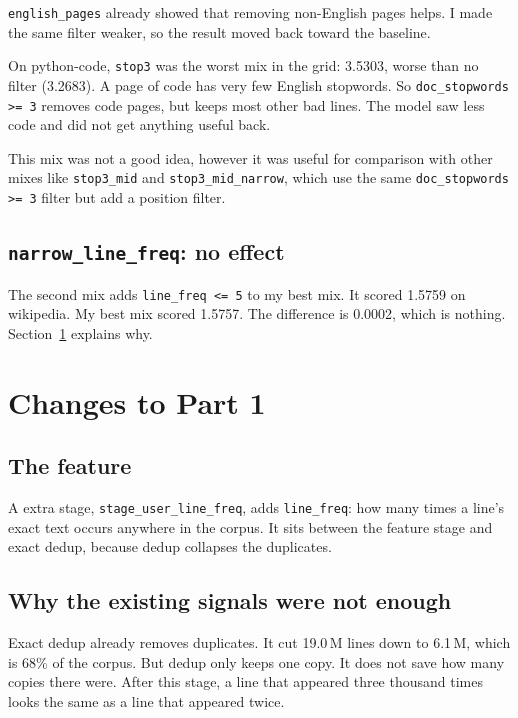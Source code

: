 \documentclass[10pt]{article}
\begin{document}
\texttt{english\_pages} already showed that removing non-English pages
helps. I made the same filter weaker, so the result moved back toward
the baseline.

On python-code, \texttt{stop3} was the worst mix in the grid: 3.5303,
worse than no filter (3.2683). A page of code has very few English
stopwords. So \texttt{doc\_stopwords >= 3} removes code pages, but keeps
most other bad lines. The model saw less code and did not get anything
useful back.

This mix was not a good idea, however it was useful for comparison with
other mixes like \texttt{stop3\_mid} and \texttt{stop3\_mid\_narrow}, 
which use the same \texttt{doc\_stopwords >= 3} filter but add a position filter.


\subsection*{\texttt{narrow\_line\_freq}: no effect}

The second mix adds \texttt{line\_freq <= 5} to my best mix. It scored
1.5759 on wikipedia. My best mix scored 1.5757. The difference is
0.0002, which is nothing. Section~\ref{sec:part1} explains why.
\newpage
\section{Changes to Part 1}
\label{sec:part1}

\subsection*{The feature}

A extra stage, \texttt{stage\_user\_line\_freq}, adds \texttt{line\_freq}:
how many times a line's exact text occurs anywhere in the corpus. It sits
between the feature stage and exact dedup, because dedup collapses the
duplicates.

\subsection*{Why the existing signals were not enough}

Exact dedup already removes duplicates. It cut 19.0\,M lines down to
6.1\,M, which is 68\% of the corpus. But dedup only keeps one copy. It
does not save how many copies there were. After this stage, a line that
appeared three thousand times looks the same as a line that appeared
twice.
\end{document}
